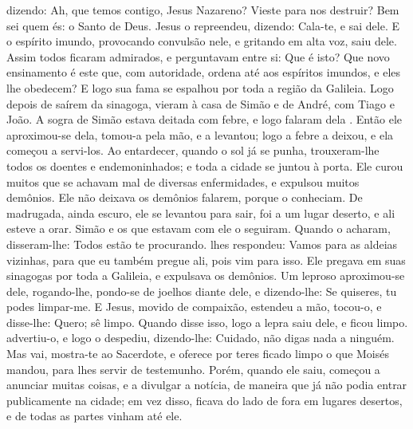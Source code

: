 {  dizendo: Ah, que temos contigo, Jesus Nazareno? Vieste para nos destruir? Bem sei quem és: o Santo de Deus.
  Jesus o repreendeu, dizendo: Cala-te, e sai dele.
  E o espírito imundo, provocando convulsão nele, e gritando em alta voz, saiu dele.
  Assim todos ficaram admirados, e perguntavam entre si: Que é isto? Que novo ensinamento é este que, com autoridade, ordena até aos espíritos imundos, e eles lhe obedecem?
  E logo sua fama se espalhou por toda a região da Galileia.
  Logo depois de saírem da sinagoga, vieram à casa de Simão e de André, com Tiago e João.
  A sogra de Simão estava deitada com febre, e logo falaram dela
{} .
  Então ele aproximou-se dela, tomou-a pela mão, e a levantou; logo a febre a deixou, e ela começou a servi-los.
  Ao entardecer, quando o sol já se punha, trouxeram-lhe todos os doentes e endemoninhados;
  e toda a cidade se juntou à porta.
  Ele curou muitos que se achavam mal de diversas enfermidades, e expulsou muitos demônios. Ele não deixava os demônios falarem, porque o conheciam.
  De madrugada, ainda escuro, ele se levantou para sair, foi a um lugar deserto, e ali esteve a orar.
  Simão e os que estavam com ele o seguiram.
  Quando o acharam, disseram-lhe: Todos estão te procurando.
   lhes respondeu: Vamos para as aldeias vizinhas, para que eu também pregue ali, pois vim para isso.
  Ele pregava em suas sinagogas por toda a Galileia, e expulsava os demônios.
  Um leproso aproximou-se dele, rogando-lhe, pondo-se de joelhos diante dele, e dizendo-lhe: Se quiseres, tu podes limpar-me.
  E Jesus,  movido de compaixão, estendeu a mão, tocou-o, e disse-lhe: Quero; sê limpo.
  Quando disse isso, logo a lepra saiu dele, e ficou limpo.
   advertiu-o, e logo o despediu,
  dizendo-lhe: Cuidado, não digas nada a ninguém. Mas vai, mostra-te ao Sacerdote, e oferece por teres ficado limpo o que Moisés mandou, para lhes servir de testemunho.
  Porém, quando ele saiu, começou a anunciar muitas coisas, e a divulgar a notícia, de maneira que
{} já não podia entrar publicamente na cidade; em vez disso, ficava do lado de fora em lugares desertos, e
{} de todas as partes vinham até ele.
\par }

